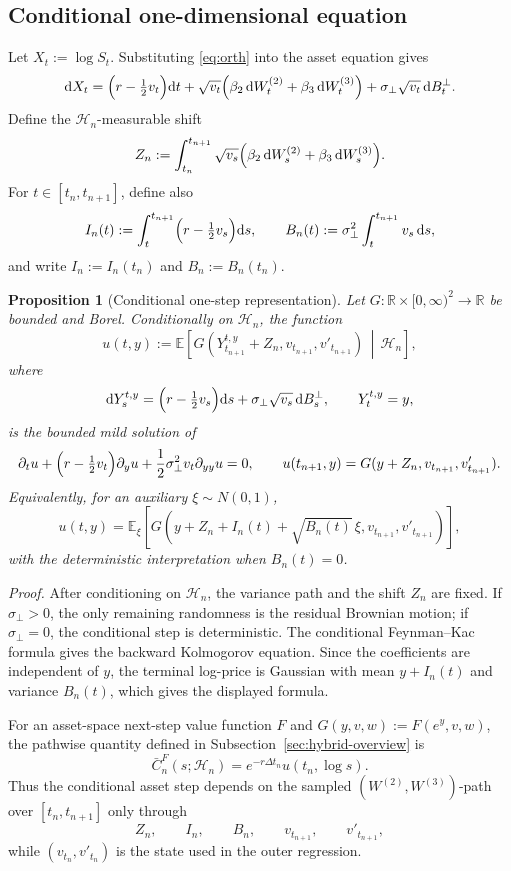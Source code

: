 \documentclass[pdflatex,sn-mathphys-num]{sn-jnl}
\theoremstyle{thmstyleone}%
\newtheorem{proposition}[theorem]{Proposition}
\theoremstyle{thmstylethree}%
\theoremstyle{thmstyletwo}%
\newcommand{\dd}{\mathrm d}
\newcommand{\E}{\mathbb E}
\newcommand{\R}{\mathbb R}
\begin{document}
\subsection{Conditional one-dimensional equation}

Let $X_t:=\log S_t$. Substituting \eqref{eq:orth} into the asset equation gives
$$
\dd X_t
=\Bigl(r-\tfrac12v_t\Bigr)\dd t
+\sqrt{v_t}\Bigl(\beta_2\,\dd W_t^{(2)}
+\beta_3\,\dd W_t^{(3)}\Bigr)
+\sigma_\perp\sqrt{v_t}\,\dd B_t^\perp .
$$
Define the $\mathcal H_n$-measurable shift
$$
Z_n:=
\int_{t_n}^{t_{n+1}}
\sqrt{v_s}\Bigl(\beta_2\,\dd W_s^{(2)}+
\beta_3\,\dd W_s^{(3)}\Bigr).
$$
For $t\in[t_n,t_{n+1}]$, define also
$$
I_n(t):=\int_t^{t_{n+1}}\Bigl(r-\tfrac12v_s\Bigr)\dd s,
\qquad
B_n(t):=\sigma_\perp^2\int_t^{t_{n+1}}v_s\,\dd s,
$$
and write $I_n:=I_n(t_n)$ and $B_n:=B_n(t_n)$.

\begin{proposition}[Conditional one-step representation]\label{prop:conditional-gaussian-step}
Let $G:\R\times[0,\infty)^2\to\R$ be bounded and Borel. Conditionally on
$\mathcal H_n$, the function
$$
u(t,y)
:=
\E\!\left[
G\!\left(
Y_{t_{n+1}}^{t,y}+Z_n,
v_{t_{n+1}},
v'_{t_{n+1}}
\right)
\,\middle|\,
\mathcal H_n
\right],
$$
where
$$
\dd Y_s^{t,y}
=\Bigl(r-\tfrac12v_s\Bigr)\dd s
+\sigma_\perp\sqrt{v_s}\,\dd B_s^\perp,
\qquad
Y_t^{t,y}=y,
$$
is the bounded mild solution of
$$
\partial_tu+
\Bigl(r-\tfrac12v_t\Bigr)\partial_yu+
\frac12\sigma_\perp^2v_t\partial_{yy}u=0,
\qquad
u(t_{n+1},y)=G(y+Z_n,v_{t_{n+1}},v'_{t_{n+1}}).
$$
Equivalently, for an auxiliary $\xi\sim N(0,1)$,
\begin{equation}\label{eq:gaussian_rep}
u(t,y)
=
\E_\xi\!\left[
G\!\left(
y+Z_n+I_n(t)+\sqrt{B_n(t)}\,\xi,
v_{t_{n+1}},
v'_{t_{n+1}}
\right)
\right],
\end{equation}
with the deterministic interpretation when $B_n(t)=0$.
\end{proposition}

\noindent\textit{Proof.} After conditioning on $\mathcal H_n$, the variance
path and the shift $Z_n$ are fixed. If $\sigma_\perp>0$, the only remaining
randomness is the residual Brownian motion; if $\sigma_\perp=0$, the
conditional step is deterministic. The conditional
Feynman--Kac formula gives the backward Kolmogorov equation. Since the
coefficients are independent of $y$, the terminal log-price is Gaussian with
mean $y+I_n(t)$ and variance $B_n(t)$, which gives the displayed formula.

For an asset-space next-step value function \(F\) and
\(G(y,v,w):=F(e^y,v,w)\), the pathwise quantity defined in
Subsection~\ref{sec:hybrid-overview} is
\[
\bar C_n^F(s;\mathcal H_n)=e^{-r\Delta t_n}u(t_n,\log s).
\]
Thus the conditional asset step depends on the sampled
$(W^{(2)},W^{(3)})$-path over $[t_n,t_{n+1}]$ only through
$$
Z_n,\qquad I_n,\qquad B_n,\qquad v_{t_{n+1}},\qquad v'_{t_{n+1}},
$$
while $(v_{t_n},v'_{t_n})$ is the state used in the outer regression.
\end{document}
